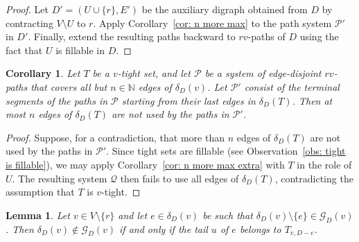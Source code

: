 \documentclass[12pt,a4paper]{amsart}
\theoremstyle{plain}
\newtheorem{corollary}[theorem]{Corollary}
\newtheorem{lemma}[theorem]{Lemma}
\theoremstyle{definition}
\begin{document}
\begin{proof}
Let $D'=(U\cup\{r\},E')$ be the auxiliary digraph obtained from $D$ by contracting $V\setminus U$ to $r$.
Apply Corollary~\ref{cor: n more max} to the path system $\mathcal{P}'$  in $D'$.
Finally, extend the resulting paths backward to $rv$-paths of $D$ using the fact that $U$ is fillable in $D$.
\end{proof}

\begin{corollary}\label{cor: at most n}
Let $T$ be a $v$-tight set, and let $\mathcal{P}$ be a system of edge-disjoint $rv$-paths that covers all but $n\in\mathbb{N}$ edges of 
$\delta_D(v)$.
Let $\mathcal{P}'$ consist of the terminal segments of the paths in $\mathcal{P}$ starting from their last edges in $\delta_D(T)$.
Then at most $n$ edges of $\delta_D(T)$ are not used by the paths in $\mathcal{P}'$.
\end{corollary}

\begin{proof}
Suppose, for a contradiction, that more than $n$ edges of $\delta_D(T)$ are not used by the paths in $\mathcal{P}'$.
Since tight sets are fillable (see Observation~\ref{obs: tight is fillable}), we may apply Corollary~\ref{cor: n more max extra} with $T$ in the role 
of $U$.
The resulting system $\mathcal{Q}$ then fails to use all edges of $\delta_D(T)$, contradicting the assumption that $T$ is $v$-tight.
\end{proof}

\begin{lemma}\label{lem: char no single}
Let $v\in V\setminus\{r\}$ and let $e\in\delta_D(v)$ be such that
$\delta_D(v)\setminus\{e\}\in\mathcal{G}_D(v)$.
Then $\delta_D(v)\notin\mathcal{G}_D(v)$ if and only if the tail $u$ of $e$ belongs to $T_{v,D-e}$.
\end{lemma}
\end{document}
